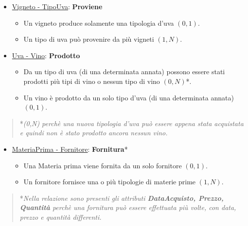 \begin{itemize}
	\item \underline{Vigneto - TipoUva}: \textbf{Proviene}
	
	\begin{itemize}
		\item Un vigneto produce solamente una tipologia d'uva $(0,1)$.
		\item Un tipo di uva può provenire da più vigneti $(1,N)$.
	\end{itemize}
	
\end{itemize}

\begin{itemize}
	\item \underline{Uva - Vino}: \textbf{Prodotto}
	
	\begin{itemize}
		\item Da un tipo di uva (di una determinata annata) possono essere stati prodotti più tipi di vino o nessun tipo di vino $(0,N)$*.
		\item Un vino è prodotto da un solo tipo d'uva (di una determinata annata) $(0,1)$.
	\end{itemize}
	
\end{itemize}

\begin{verse}
	*\emph{(0,N) perchè una nuova tipologia d'uva può essere appena stata acquistata e quindi non è stato prodotto ancora nessun vino.}
\end{verse}


\begin{itemize}
	\item \underline{MateriaPrima - Fornitore}: \textbf{Fornitura}*
	
	\begin{itemize}
		\item Una Materia prima viene fornita da un solo fornitore $(0,1)$.
		\item Un fornitore fornisce una o più tipologie di materie prime $(1,N)$.
	\end{itemize}
	
\end{itemize}

\begin{verse}
*\emph{Nella relazione sono presenti gli attributi \textbf{DataAcquisto, Prezzo, Quantità} perchè una fornitura può essere effettuata più volte, con data, prezzo e quantità differenti.}
\end{verse}


